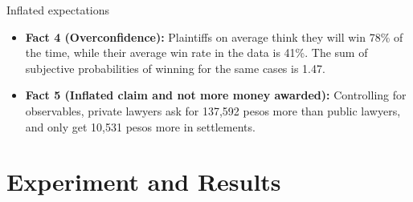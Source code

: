 \documentclass[9pt]{beamer}
\begin{document}
\begin{frame}{Inflated expectations}
    \begin{itemize}
        \item  \textbf{Fact 4 (Overconfidence):} Plaintiffs on average think they will win 78\% of the time, while their average win rate in the data is 41\%. The sum of subjective probabilities of winning for the same cases is 1.47.
        \vspace{0.2in}
        
         \item \textbf{Fact 5 (Inflated claim and not more money awarded):} Controlling for observables, private lawyers ask for 137,592 pesos more than public lawyers, and only get 10,531 pesos more in settlements.
    \end{itemize}
  
\end{frame}


\section{Experiment and Results}
\end{document}
